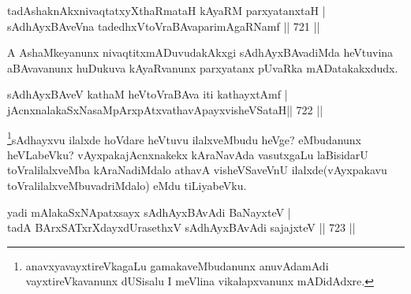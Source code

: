 \begin{shl}
tadAshaknAkxnivaqtatxyXthaRmataH kAyaRM parxyatanxtaH | \\
sAdhAyxBAveVna tadedhxVtoVraBAvaparimAgaRNamf \hfill||  721 ||  
\end{shl}

\begin{artha}
A AshaMkeyanunx nivaqtitxmADuvudakAkxgi sAdhAyxBAvadiMda heVtuvina aBAvavanunx huDukuva kAyaRvanunx parxyatanx pUvaRka mADatakakxdudx.
\end{artha}


\begin{shl}
sAdhAyxBAveV kathaM heVtoVraBAva iti kathayxtAmf | \\
\footnotemark[2]jAcnxnalakaSxNasaMpArxpAtxvathavA\s payxvisheVSataH\hfill||  722 || 
\end{shl}

\begin{artha}
\footnote[1]{anavxyavayxtireVkagaLu gamakaveMbudanunx anuvAdamAdi vayxtireVkavanunx dUSisalu I meVlina vikalapxvanunx mADidAdxre.}sAdhayxvu ilalxde hoVdare heVtuvu ilalxveMbudu heVge? eMbudanunx heVLabeVku? vAyxpakajAcnxnakekx kAraNavAda vasutxgaLu laBisidarU toVralilalxveMba kAraNadiMdalo athavA visheVSaveVnU ilalxde(vAyxpakavu toVralilalxveMbuvadriMdalo) eMdu tiLiyabeVku.
\end{artha}


\begin{shl}
yadi mAlakaSxNApatxsayx sAdhAyxBAvAdi BaNayxteV | \\
tadA BArxSATxrXdayxdUrasethxV sAdhAyxBAvAdi sajajxteV \hfill||  723 ||  
\end{shl}

